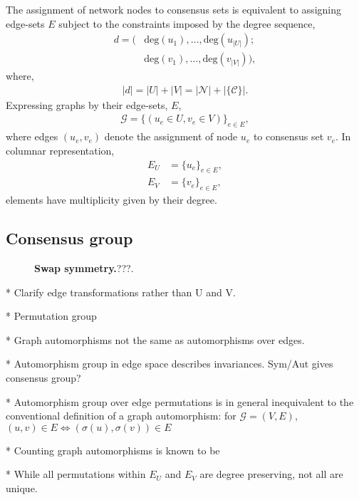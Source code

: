 \documentclass[twocolumn, aps, amsmath, amssymb, nofootinbib, superscriptaddress, longbibliography, floatfix, eqsecnum, rmp]{revtex4-2}
\begin{document}
The assignment of network nodes to consensus sets is equivalent to assigning edge-sets $E$ subject to the constraints imposed by the degree sequence,
\begin{align} \label{eq:degree_seq}
	d = (&\mathrm{deg}(u_1),\dots,\mathrm{deg}(u_{|U|});\nonumber\\
	&\mathrm{deg}(v_1),\dots,\mathrm{deg}(v_{|V|})),
\end{align}
where,
\begin{align}
	|d| = |U|+|V| = |\mathcal{N}|+|\{\mathcal{C}\}|.
\end{align}
Expressing graphs by their edge-sets, $E$,
\begin{align}
	\mathcal{G} = \{(u_e\in U, v_e\in V)\}_{e\in E},
\end{align}
where edges $(u_e,v_e)$ denote the assignment of node $u_e$ to consensus set $v_e$. In columnar representation,
\begin{align}
	E_U &= \{u_e\}_{e\in E},\nonumber\\
	E_V &= \{v_e\}_{e\in E},	
\end{align}
elements have multiplicity given by their degree.

\subsection{Consensus group} \label{sec:assign_group}

\begin{figure}[!htb]
	\centering
	
	\caption{\textbf{Swap symmetry.}???.}\label{fig:swap_symmetry}
\end{figure}

* Clarify edge transformations rather than U and V.

* Permutation group

* Graph automorphisms not the same as automorphisms over edges.

* Automorphism group in edge space describes invariances. Sym/Aut gives consensus group?

* Automorphism group over edge permutations is in general inequivalent to the conventional definition of a graph automorphism: for $\mathcal{G}=(V,E)$, $(u,v)\in E \Leftrightarrow (\sigma(u),\sigma(v))\in E$ %

* Counting graph automorphisms is known to be 

* While all permutations within $E_U$ and $E_V$ are degree preserving, not all are unique.
\end{document}
